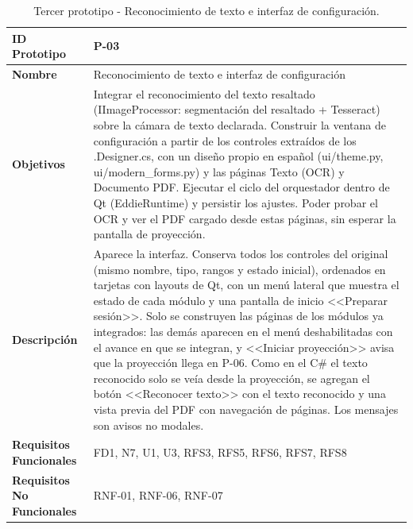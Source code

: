 \begin{table}[H]
\centering
\caption{Tercer prototipo - Reconocimiento de texto e interfaz de configuración.}
\label{tab:prototipo-p03}
\small
\begin{tabularx}{\textwidth}{>{\bfseries}l X}
\toprule
ID Prototipo & P-03 \\ \midrule
Nombre & Reconocimiento de texto e interfaz de configuración \\ \midrule
Objetivos & Integrar el reconocimiento del texto resaltado (IImageProcessor: segmentación del resaltado + Tesseract) sobre la cámara de texto declarada. \newline Construir la ventana de configuración a partir de los controles extraídos de los .Designer.cs, con un diseño propio en español (ui/theme.py, ui/modern\_forms.py) y las páginas Texto (OCR) y Documento PDF. \newline Ejecutar el ciclo del orquestador dentro de Qt (EddieRuntime) y persistir los ajustes. \newline Poder probar el OCR y ver el PDF cargado desde estas páginas, sin esperar la pantalla de proyección. \\ \midrule
Descripción & Aparece la interfaz. Conserva todos los controles del original (mismo nombre, tipo, rangos y estado inicial), ordenados en tarjetas con layouts de Qt, con un menú lateral que muestra el estado de cada módulo y una pantalla de inicio <<Preparar sesión>>. Solo se construyen las páginas de los módulos ya integrados: las demás aparecen en el menú deshabilitadas con el avance en que se integran, y <<Iniciar proyección>> avisa que la proyección llega en P-06. Como en el C\# el texto reconocido solo se veía desde la proyección, se agregan el botón <<Reconocer texto>> con el texto reconocido y una vista previa del PDF con navegación de páginas. Los mensajes son avisos no modales. \\ \midrule
Requisitos Funcionales & FD1, N7, U1, U3, RFS3, RFS5, RFS6, RFS7, RFS8 \\ \midrule
Requisitos No Funcionales & RNF-01, RNF-06, RNF-07 \\ \bottomrule
\end{tabularx}
\end{table}

